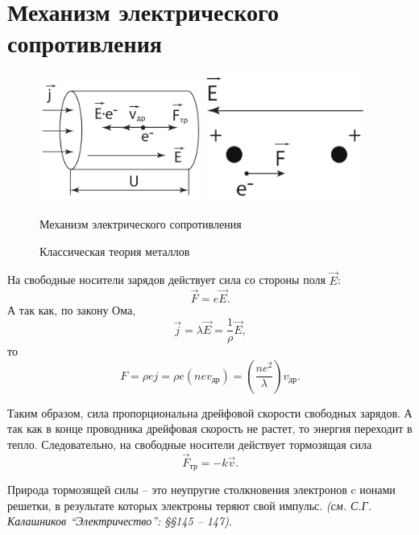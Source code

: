 \section{Механизм электрического сопротивления}
    \begin{figure}[!t]
        \center
        \includegraphics[width=0.47\textwidth]{lec07/resistance_mechanism.pdf} 
        \hfill
        \includegraphics[width=0.47\textwidth]{lec07/classic_theory.pdf}
        \parbox[t]{.47\textwidth}{\caption{Механизм электрического
            сопротивления}}
        \hfill
        \parbox[t]{.47\textwidth}{\caption{Классическая теория металлов}}
    \end{figure}

    На свободные носители зарядов действует сила со стороны поля \( \vec{E} \):
    \[
        \vec{F} = e\vec{E}.
    \]
    А так как, по закону Ома,
    \[
        \vec{j} = \lambda\vec{E} = \frac{1}{\rho}\vec{E},
    \]
    то
    \[
        F = \rho ej = \rho e(nev_{\textit{др}}) = 
        \left(\frac{ne^2}{\lambda}\right)v_{\textit{др}}.
    \]
    
    Таким образом, сила пропорциональна дрейфовой скорости свободных зарядов.
    А так как в конце проводника дрейфовая скорость не растет, то энергия
    переходит в тепло. Следовательно, на свободные носители действует тормозящая
    сила
    \[
        \vec{F}_{\textit{тр}} = -k\vec{v}.
    \]
    
    Природа тормозящей силы -- это неупругие столкновения электронов c ионами
    решетки, в результате которых электроны теряют свой импульс.
    \textit{(см. С.Г. Калашников “Электричество”: \S\S 145 -- 147)}.
   
